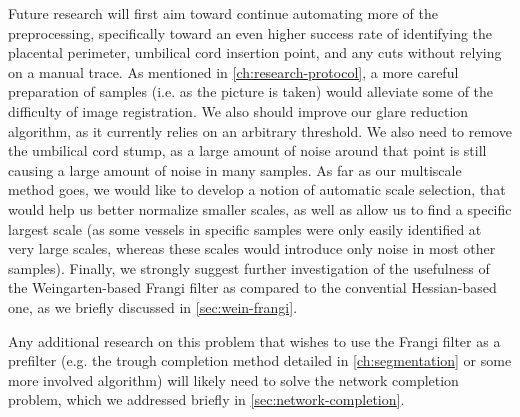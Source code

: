 Future research will first aim toward continue automating more of the preprocessing, specifically toward an even higher success rate of identifying the placental perimeter, umbilical cord insertion point, and any cuts without relying on a manual trace.  As mentioned in \cref{ch:research-protocol}, a more careful preparation of samples (i.e. as the picture is taken) would alleviate some of the difficulty of image registration. We also should improve our glare reduction algorithm, as it currently relies on an arbitrary threshold. We also need to remove the umbilical cord stump, as a large amount of noise around that point is still causing a large amount of noise in many samples. As far as our multiscale method goes, we would like to develop a notion of automatic scale selection, that would help us better normalize smaller scales, as well as allow us to find a specific largest scale (as some vessels in specific samples were only easily identified at very large scales, whereas these scales would introduce only noise in most other samples).
Finally, we strongly suggest further investigation of the usefulness of the Weingarten-based Frangi filter as compared to the convential Hessian-based one, as we briefly discussed in \cref{sec:wein-frangi}.

Any additional research on this problem that wishes to use the Frangi filter as a prefilter  (e.g. the trough completion method detailed in \cref{ch:segmentation} or some more involved algorithm) will likely need to solve the network completion problem, which we addressed briefly in \cref{sec:network-completion}.
